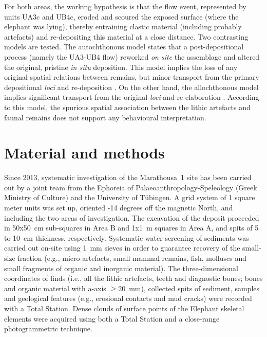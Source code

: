 \documentclass[preprint,authoryear,times]{elsarticle} %
\begin{document}
For both areas, the working hypothesis is that the flow event, represented by units UA3c and UB4c, eroded and scoured the exposed surface (where the elephant was lying), thereby entraining clastic material (including probably artefacts) and re-depositing this material at a close distance. Two contrasting models are tested. The autochthonous model \citep[][sensu]{Dominguez-Rodrigo2012} states that a post-depositional process (namely the UA3-UB4 flow) reworked \emph{on site} the assemblage and altered the original, pristine \emph{in situ} deposition. This model implies the loss of any original spatial relations between remains, but minor transport from the primary depositional \emph{loci} and re-deposition \citep[][sensu]{Fernandez-Lopez}. On the other hand, the allochthonous model \citep[][sensu]{Dominguez-Rodrigo2012} implies significant transport from the original \emph{loci} and re-elaboration \citep[][sensu]{Fernandez-Lopez}. According to this model, the spurious spatial association between the lithic artefacts and faunal remains does not support any behavioural interpretation.

\section{Material and methods}

Since 2013, systematic investigation of the Marathousa~1 site has been carried out by a joint team from the Ephoreia of Palaeoanthropology-Speleology (Greek Ministry of Culture) and the University of Tübingen. A grid system of 1 square meter units was set up, oriented -14 degrees off the magnetic North, and including the two areas of investigation. The excavation of the deposit proceeded in 50x50~cm sub-squares in Area B and 1x1~m squares in Area A, and spits of 5 to 10~cm thickness, respectively. Systematic water-screening of sediments was carried out on-site using 1~mm sieves in order to guarantee recovery of the small-size fraction (e.g., micro-artefacts, small mammal remains, fish, molluscs and small fragments of organic and inorganic material). The three-dimensional coordinates of finds (i.e., all the lithic artefacts, teeth and diagnostic bones; bones and organic material with a-axis $\geq20$~mm), collected spits of sediment, samples and geological features (e.g., erosional contacts and mud cracks) were recorded with a Total Station. Dense clouds of surface points of the Elephant skeletal elements were acquired using both a Total Station and a close-range photogrammetric technique. %
\end{document}
